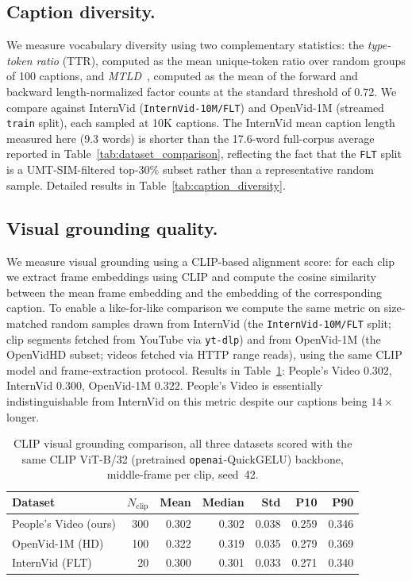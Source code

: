 \documentclass{article}
\begin{document}
\subsection{Caption diversity.}

We measure vocabulary diversity using two complementary statistics: the \textit{type-token ratio} (TTR), computed as the mean unique-token ratio over random groups of 100 captions, and \textit{MTLD}~\cite{mccarthy2010mtld}, computed as the mean of the forward and backward length-normalized factor counts at the standard threshold of 0.72. We compare against InternVid (\texttt{InternVid-10M/FLT}) and OpenVid-1M (streamed \texttt{train} split), each sampled at 10K captions. The InternVid mean caption length measured here (9.3 words) is shorter than the 17.6-word full-corpus average reported in Table~\ref{tab:dataset_comparison}, reflecting the fact that the \texttt{FLT} split is a UMT-SIM-filtered top-30\% subset rather than a representative random sample. Detailed results in Table~\ref{tab:caption_diversity}.

\subsection{Visual grounding quality.}

We measure visual grounding using a CLIP-based alignment score: for each clip we extract frame embeddings using CLIP and compute the cosine similarity between the mean frame embedding and the embedding of the corresponding caption. To enable a like-for-like comparison we compute the same metric on size-matched random samples drawn from InternVid (the \texttt{InternVid-10M/FLT} split; clip segments fetched from YouTube via \texttt{yt-dlp}) and from OpenVid-1M (the OpenVidHD subset; videos fetched via HTTP range reads), using the same CLIP model and frame-extraction protocol. Results in Table~\ref{tab:visual_grounding}: People's Video $0.302$, InternVid $0.300$, OpenVid-1M $0.322$. People's Video is essentially indistinguishable from InternVid on this metric despite our captions being $14\times$ longer.

\begin{table}[t]
\centering
\caption{CLIP visual grounding comparison, all three datasets scored with the same CLIP ViT-B/32 (pretrained \texttt{openai}-QuickGELU) backbone, middle-frame per clip, seed~42.}
\label{tab:visual_grounding}
\begin{tabular}{lrrrrrr}
\toprule
Dataset & $N_{\text{clip}}$ & Mean & Median & Std & P10 & P90 \\
\midrule
People's Video (ours) & 300 & 0.302 & 0.302 & 0.038 & 0.259 & 0.346 \\
OpenVid-1M (HD)       & 100 & 0.322 & 0.319 & 0.035 & 0.279 & 0.369 \\
InternVid (FLT)       & 20  & 0.300 & 0.301 & 0.033 & 0.271 & 0.340 \\
\bottomrule
\end{tabular}
\end{table}
\end{document}
